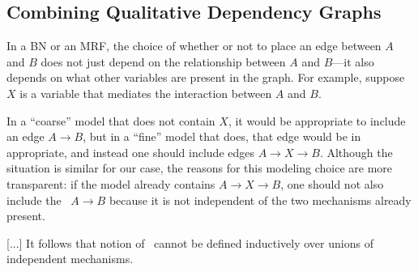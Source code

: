 \begin{subappendices}
{\section{Combining Qualitative Dependency Graphs}
    \label{sec:union}
    
In a BN or an MRF, the choice of whether
or not to place an edge between $A$ and $B$
does not just depend on the relationship between $A$ and $B$---it also
    depends on what other variables are present in the graph.
For example, suppose $X$ is a variable that mediates
    the interaction between $A$ and $B$.

In a ``coarse'' model that does not contain $X$, it would be appropriate
to include an edge $A{\to}B$, but in a ``fine'' model that does, that edge
would be in appropriate, and instead one should include edges $A{\to}X{\to}B$.
Although the situation is similar for our case, the reasons
for this modeling choice are more transparent: if the model already contains $A{\to}X{\to}B$,
one should not also include the \arc\ $A{\to}B$ because it is not independent of the two mechanisms already present.    

[...] It follows that notion of \scibility\ cannot be
defined inductively over unions of independent mechanisms. 
}


\end{subappendices}
